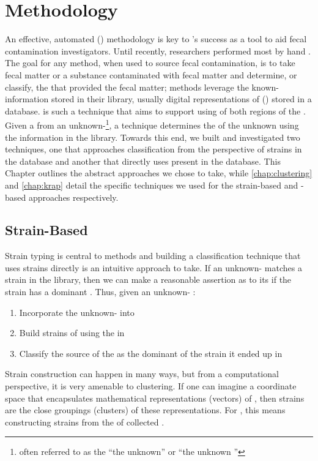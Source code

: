\chapter{\MSTlong{} Methodology}\label{chap:methodology}
An effective, automated \mstlong{} (\mst{}) methodology is key to \cplop{}'s success as a tool to aid fecal contamination investigators.
Until recently, \cp{} researchers performed most \mst{} by hand \cite{moritz2015application, shapiro2015source}.
The goal for any \mst{} method, when used to source fecal contamination, is to take fecal matter or a substance contaminated with fecal matter and determine, or classify, the \spec{} that provided the fecal matter; \libdep{} \mst{} methods leverage the known-\spec{} information stored in their library, usually digital representations of \fiblong{} (\fib{}) stored in a database.
\cplop{} is such a \libdep{} technique that aims to support \mst{} using \pyros{} of both \itsshort{} regions of the \fib{} \ecoli{}.
Given a \fib{} \isol{} from an unknown-\spec{}\footnote{often referred to as the ``the unknown'' or ``the unknown \isol{}''}, a \libdep{} \mst{} technique determines the \spec{} of the unknown using the information in the library.
Towards this end, we built and investigated two \mst{} techniques, one that approaches \spec{} classification from the perspective of strains in the database and another that directly uses \isols{} present in the database.
This Chapter outlines the abstract approaches we chose to take, while \autoref{chap:clustering} and \autoref{chap:krap} detail the specific techniques we used for the strain-based and \isol{}-based approaches respectively.

\section{Strain-Based}
Strain typing is central to \libdep{} \mst{} methods and building a \spec{} classification technique that uses strains directly is an intuitive approach to take.
If an unknown-\spec{} matches a strain in the library, then we can make a reasonable assertion as to its \spec{} if the strain has a dominant \spec{}.
Thus, given an unknown-\spec{} \isol{}: 
\begin{enumerate}
    \item Incorporate the unknown-\spec{} \fib{} \isol{} into \cplop{}
    \item Build strains of \fib{} using the \isols{} in \cplop{}
    \item Classify the source \spec{} of the \isol{} as the dominant \spec{} of the strain it ended up in
\end{enumerate}
Strain construction can happen in many ways, but from a computational perspective, it is very amenable to clustering.
If one can imagine a coordinate space that encapsulates mathematical representations (vectors) of \fib{} \isols{}, then strains are the close groupings (clusters) of these \isol{} representations.
For \cplop{}, this means constructing strains from the \pyros{} of collected \ecoli{} \isols{}.

